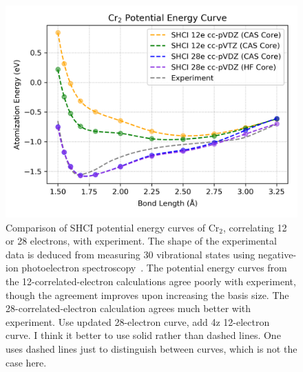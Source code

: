 \label{sec:curve}
\begin{figure}
  \begin{center}
  \includegraphics[width=0.9\linewidth]{figs/cr2curve.png}
  \caption{Comparison of SHCI potential energy curves of Cr$_2$, correlating 12 or 28 electrons, with experiment.
  The shape of the experimental data is deduced from measuring 30 vibrational states using negative-ion photoelectron spectroscopy~\cite{casey1993negative}.
  The potential energy curves from the 12-correlated-electron calculations agree poorly with experiment, though the agreement
  improves upon increasing the basis size.
  The 28-correlated-electron calculation agrees much better with experiment.
  {\color{red} Use updated 28-electron curve, add 4z 12-electron curve.  I think it better to use solid rather than dashed lines.  One uses dashed lines just to distinguish between curves, which is not the case here.}
}
  \label{fig:cr2curve}
  \end{center}
\end{figure}

